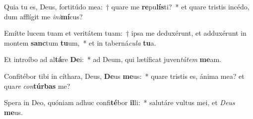 \item Quia tu es, Deus, fortitúdo mea:~† quare me \textbf{re}pu\textbf{lís}ti?~* et quare tristis incédo, dum afflígit me \textit{in}\textit{i}\textbf{mí}cus?
\item Emítte lucem tuam et veritátem tuam:~† ipsa me deduxérunt, et adduxérunt in montem \textbf{sanc}tum \textbf{tu}um,~* et in taberná\textit{cu}\textit{la} \textbf{tu}a.
\item Et introíbo ad al\textbf{tá}re \textbf{De}i:~* ad Deum, qui lætíficat juven\textit{tú}\textit{tem} \textbf{me}am.
\item Confitébor tibi in cíthara, Deus, \textbf{De}us \textbf{me}us:~* quare tristis es, ánima mea? et qua\textit{re} \textit{con}\textbf{túr}\textbf{bas} me?
\item Spera in Deo, quóniam adhuc confi\textbf{té}bor \textbf{il}li:~* salutáre vultus mei, et \textit{De}\textit{us} \textbf{me}us.

